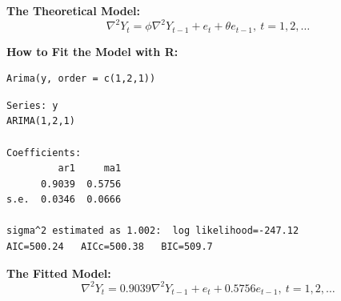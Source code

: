 \documentclass[12pt]{article}
\begin{document}
\noindent
\textbf{The Theoretical Model:} 
\[
\nabla^{2} Y_{t} = \phi \nabla^{2} Y_{t - 1} + e_{t} + \theta e_{t - 1},\ t = 1,2,\ldots
\]

\noindent
\textbf{How to Fit the Model with R:}


\begin{verbatim}
Arima(y, order = c(1,2,1))
\end{verbatim}




\begin{verbatim}
Series: y 
ARIMA(1,2,1)                    

Coefficients:
         ar1     ma1
      0.9039  0.5756
s.e.  0.0346  0.0666

sigma^2 estimated as 1.002:  log likelihood=-247.12
AIC=500.24   AICc=500.38   BIC=509.7
\end{verbatim}

\noindent
\textbf{The Fitted Model:} 
\[
\nabla^{2} Y_{t} =  0.9039 \nabla^{2} Y_{t - 1} + e_{t} +  0.5756 e_{t - 1},\ t = 1,2,\ldots
\]
\end{document}
